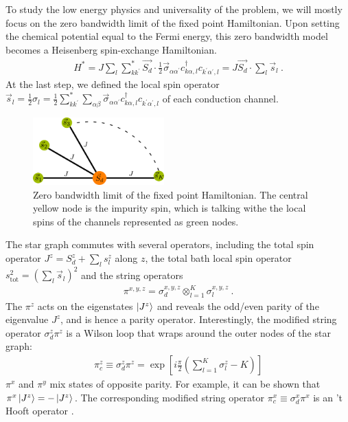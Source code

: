 \documentclass[reprint,prb,superscriptaddress]{revtex4-2}
\begin{document}
To study the low energy physics and universality of the problem, we will mostly focus on the zero bandwidth limit of the fixed point Hamiltonian. Upon setting the chemical potential equal to the Fermi energy, this zero bandwidth model becomes a Heisenberg spin-exchange Hamiltonian.
\begin{equation}\begin{aligned}
	\label{stargraph}
	H^* = J\sum_l\sum_{kk^\prime}^* \vec{S_d}\cdot\frac{1}{2}\vec{\sigma}_{\alpha\alpha^\prime}c_{k\alpha,l}^\dagger c_{k^\prime\alpha^\prime, l} = J\vec{S_d}\cdot\sum_l \vec{s}_l~.
\end{aligned}\end{equation}
At the last step, we defined the local spin operator \(\vec{s}_l = \frac{1}{2}\sigma_l = \frac{1}{2}\sum_{kk^\prime}^*\sum_{\alpha\beta}\vec{\sigma}_{\alpha\alpha^\prime}c_{k\alpha,l}^\dagger c_{k^\prime\alpha^\prime, l}\) of each conduction channel.
\begin{figure}[htpb]
	\centering
	\includegraphics[width=0.45\textwidth]{./stargraph.pdf}
	\caption{Zero bandwidth limit of the fixed point Hamiltonian. The central yellow node is the impurity spin, which is talking withe the local spins of the channels represented as green nodes.}
	\label{fig:-stargraph-pdf}
\end{figure}
The star graph commutes with several operators, including the total spin operator \(J^z = S_d^z + \sum_l s_l^z\) along \(z\), the total bath local spin operator \(s^2_\text{tot} = \left(\sum_l \vec s_l\right)^2\) and the string operators 
\begin{equation}\begin{aligned}
\pi^{x,y,z} = \sigma_d^{x,y,z} \otimes_{l=1}^K \sigma_l^{x,y,z}~.
\end{aligned}\end{equation}
The \(\pi^z\) acts on the eigenstates \(\ket{J^z}\) and reveals the odd/even parity of the eigenvalue \(J^z\), and is hence a parity operator. Interestingly, the modified string operator \(\sigma_d^z \pi^z\) is a Wilson loop that wraps around the outer nodes of the star graph:
\begin{equation}\begin{aligned}
	\label{w_loop}
	\pi^z_c \equiv \sigma_d^z \pi^z = \exp\left[i \frac{\pi}{2} \left(\sum_{l=1}^K \sigma^z_l - K\right)\right] 
\end{aligned}\end{equation}
\(\pi^x\) and \(\pi^y\) mix states of opposite parity. For example, it can be shown that \(\pi^x \ket{J^z} = -\ket{J^z}\). The corresponding modified string operator \(\pi^x_c \equiv \sigma_d^x \pi^x\) is an 't Hooft operator \cite{fradkin2013field}.
\end{document}
